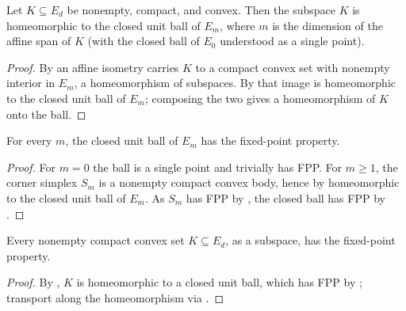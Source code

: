 \begin{lemma}
    \label{lem:convex-homeo-ball}
    Let $K \subseteq E_d$ be nonempty, compact, and convex. Then the subspace
    $K$ is homeomorphic to the closed unit ball of $E_m$, where $m$ is the
    dimension of the affine span of $K$ (with the closed ball of $E_0$
    understood as a single point).
\end{lemma}
\begin{proof}
    By  an affine isometry carries $K$ to a compact
    convex set with nonempty interior in $E_m$, a homeomorphism of subspaces. By
     that image is homeomorphic to the closed
    unit ball of $E_m$; composing the two gives a homeomorphism of $K$ onto the
    ball.
\end{proof}

\begin{lemma}
    \label{lem:ball-fpp}
    For every $m$, the closed unit ball of $E_m$ has the fixed-point property.
\end{lemma}
\begin{proof}
    For $m = 0$ the ball is a single point and trivially has FPP. For $m \ge 1$,
    the corner simplex $S_m$ is a nonempty compact convex body, hence by
     homeomorphic to the closed unit ball of $E_m$.
    As $S_m$ has FPP by , the closed ball has FPP by
    .
\end{proof}

\begin{lemma}
    \label{lem:convex-fpp}
    Every nonempty compact convex set $K \subseteq E_d$, as a subspace, has the
    fixed-point property.
\end{lemma}
\begin{proof}
    By , $K$ is homeomorphic to a closed unit ball,
    which has FPP by ; transport along the homeomorphism via
    .
\end{proof}

